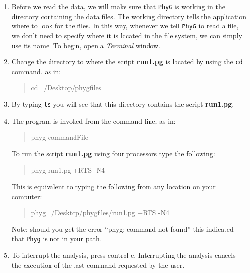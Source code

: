 \documentclass[]{article}
\newcommand{\phyg}{\texttt{PhyG} }
\begin{document}
\begin{enumerate}

\item Before we read the data, we will make sure that \phyg is working in the directory 
containing the data files. The working directory tells the application where to look 
for the files. In this way, whenever we tell \phyg to read a file, we don't need to 
specify where it is located in the file system, we can simply use its name. To 
begin, open a \textit{Terminal} window.
        
\item Change the directory to where the script \textbf{run1.pg} is located by using the 
\texttt{cd} command, as in:
		
	\begin{quote}
	cd ~/Desktop/phygfiles
	\end{quote}
   
\item By typing \texttt{ls} you will see that this directory contains the script 
\textbf{run1.pg}.

\item The program is invoked from the command-line, as in:
		
	\begin{quote}
	phyg commandFile
	\end{quote}
	
To run the script \textbf{run1.pg} using four processors type the following:
		
	\begin{quote}
  	phyg run1.pg +RTS -N4
	\end{quote}
	
This is equivalent to typing the following from any location on your computer:
	
	\begin{quote}
  	phyg ~/Desktop/phygfiles/run1.pg +RTS -N4
	\end{quote}

Note: should you get the error ``phyg: command not found'' this indicated that 
\texttt{Phyg} is not in your path. 
	
\item To interrupt the analysis, press control-c. Interrupting the analysis cancels 
the execution of the last command requested by the user. 

\end{enumerate}

\end{document}
